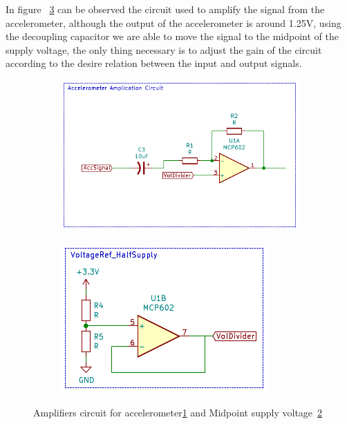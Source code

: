 In figure ~\ref{fig:accCircCom} can be observed the circuit used to amplify the signal from the accelerometer, although the output of the accelerometer is around 1.25V, using the decoupling capacitor we are able to move the signal to the midpoint of the supply voltage, the only thing necessary is to adjust the gain of the circuit according to the desire relation between the input and output signals.
\begin{figure}[]
    \centering
    \begin{subfigure}{0.3\textwidth}
        \centering
        \includegraphics[width=\linewidth]{Chapters/4CHP/Figures/AmpAccCirc.pdf}
        \caption{}{}
        \label{subfig:AccAmpCirc}
    \end{subfigure}
    \begin{subfigure}{0.3\textwidth}
        \centering
        \includegraphics[width=\linewidth]{Chapters/4CHP/Figures/HalfSupply.pdf}
        \caption{}{}
        \label{subfig:VoltageDiv}
    \end{subfigure}
    \caption{Amplifiers circuit for accelerometer\ref{subfig:AccAmpCirc} and Midpoint supply voltage~\ref{subfig:VoltageDiv}}{}
\label{fig:accCircCom}
\end{figure}

